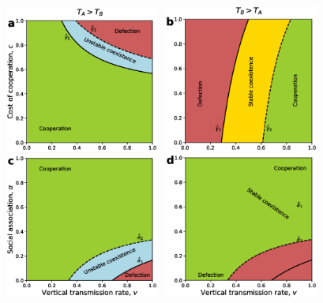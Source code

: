 \documentclass[12pt]{extarticle}
\begin{document}
{\begin{figure}[h]
  \centering       
    \includegraphics[width=0.45\textwidth]{Result3_TA_TB.eps}~
    \includegraphics[width=0.45\textwidth]{Result3_TB_TA.eps}
    \includegraphics[width=0.45\textwidth]{Result3_alpha_Vs_v_TA_TB.eps}~
    \includegraphics[width=0.45\textwidth]{Result3_alpha_Vs_v_TB_TA.eps}

\end{figure}}
\end{document}
